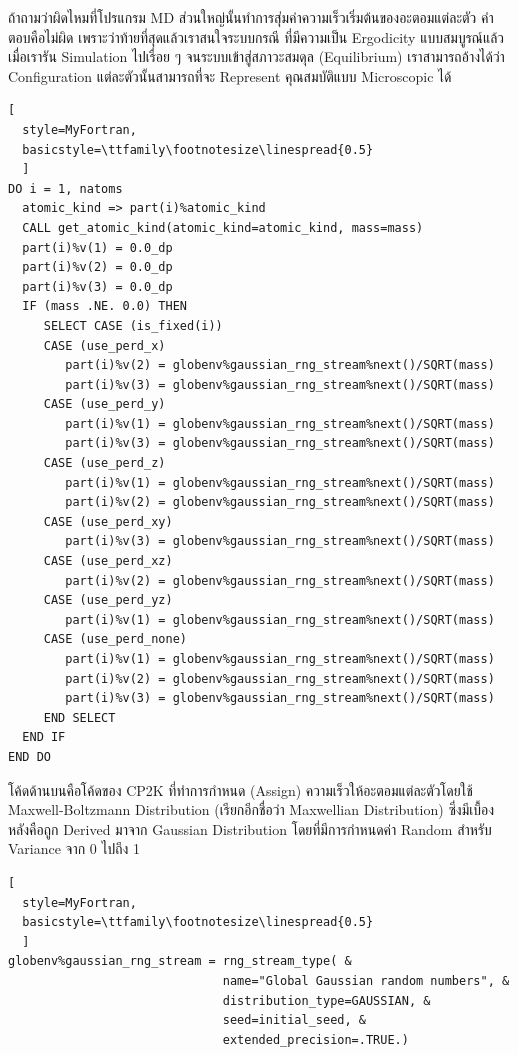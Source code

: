 ถ้าถามว่าผิดไหมที่โปรแกรม MD ส่วนใหญ่นั้นทำการสุ่มค่าความเร็วเริ่มต้นของอะตอมแต่ละตัว คำตอบคือไม่ผิด เพราะว่าท้ายที่สุดแล้วเราสนใจระบบกรณี%
ที่มีความเป็น Ergodicity แบบสมบูรณ์แล้ว เมื่อเรารัน Simulation ไปเรื่อย ๆ จนระบบเข้าสู่สภาวะสมดุล (Equilibrium) เราสามารถอ้างได้ว่า
Configuration แต่ละตัวนั้นสามารถที่จะ Represent คุณสมบัติแบบ Microscopic ได้

\vspace{5pt}

\begin{lstlisting}[
  style=MyFortran,
  basicstyle=\ttfamily\footnotesize\linespread{0.5}
  ]
DO i = 1, natoms
  atomic_kind => part(i)%atomic_kind
  CALL get_atomic_kind(atomic_kind=atomic_kind, mass=mass)
  part(i)%v(1) = 0.0_dp
  part(i)%v(2) = 0.0_dp
  part(i)%v(3) = 0.0_dp
  IF (mass .NE. 0.0) THEN
     SELECT CASE (is_fixed(i))
     CASE (use_perd_x)
        part(i)%v(2) = globenv%gaussian_rng_stream%next()/SQRT(mass)
        part(i)%v(3) = globenv%gaussian_rng_stream%next()/SQRT(mass)
     CASE (use_perd_y)
        part(i)%v(1) = globenv%gaussian_rng_stream%next()/SQRT(mass)
        part(i)%v(3) = globenv%gaussian_rng_stream%next()/SQRT(mass)
     CASE (use_perd_z)
        part(i)%v(1) = globenv%gaussian_rng_stream%next()/SQRT(mass)
        part(i)%v(2) = globenv%gaussian_rng_stream%next()/SQRT(mass)
     CASE (use_perd_xy)
        part(i)%v(3) = globenv%gaussian_rng_stream%next()/SQRT(mass)
     CASE (use_perd_xz)
        part(i)%v(2) = globenv%gaussian_rng_stream%next()/SQRT(mass)
     CASE (use_perd_yz)
        part(i)%v(1) = globenv%gaussian_rng_stream%next()/SQRT(mass)
     CASE (use_perd_none)
        part(i)%v(1) = globenv%gaussian_rng_stream%next()/SQRT(mass)
        part(i)%v(2) = globenv%gaussian_rng_stream%next()/SQRT(mass)
        part(i)%v(3) = globenv%gaussian_rng_stream%next()/SQRT(mass)
     END SELECT
  END IF
END DO
\end{lstlisting}

\vspace{5pt}

โค้ดด้านบนคือโค้ดของ CP2K ที่ทำการกำหนด (Assign) ความเร็วให้อะตอมแต่ละตัวโดยใช้ Maxwell-Boltzmann Distribution
(เรียกอีกชื่อว่า Maxwellian Distribution) ซึ่งมีเบื้องหลังคือถูก Derived มาจาก Gaussian Distribution โดยที่มีการกำหนดค่า Random
สำหรับ Variance จาก 0 ไปถึง 1

\vspace{5pt}

\begin{lstlisting}[
  style=MyFortran,
  basicstyle=\ttfamily\footnotesize\linespread{0.5}
  ]
globenv%gaussian_rng_stream = rng_stream_type( &
                              name="Global Gaussian random numbers", &
                              distribution_type=GAUSSIAN, &
                              seed=initial_seed, &
                              extended_precision=.TRUE.)
\end{lstlisting}

